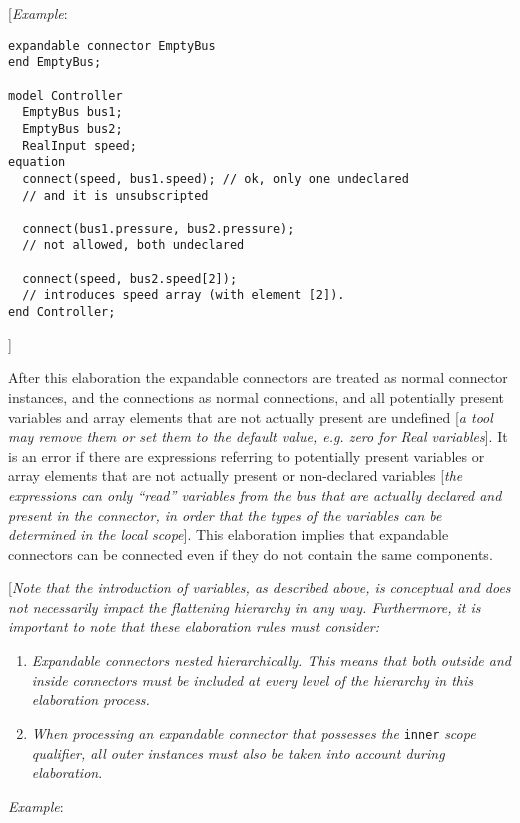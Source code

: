 {[}\emph{Example}:
\begin{lstlisting}[language=modelica]
expandable connector EmptyBus
end EmptyBus;

model Controller
  EmptyBus bus1;
  EmptyBus bus2;
  RealInput speed;
equation
  connect(speed, bus1.speed); // ok, only one undeclared
  // and it is unsubscripted

  connect(bus1.pressure, bus2.pressure);
  // not allowed, both undeclared

  connect(speed, bus2.speed[2]);
  // introduces speed array (with element [2]).
end Controller;
\end{lstlisting}
{]}

After this elaboration the expandable connectors are treated as normal
connector instances, and the connections as normal connections, and all
potentially present variables and array elements that are not actually
present are undefined {[}\emph{a tool may remove them or set them to the
default value, e.g. zero for Real variables}{]}. It is an error if there
are expressions referring to potentially present variables or array
elements that are not actually present or non-declared variables
{[}\emph{the expressions can only ``read'' variables from the bus that
are actually declared and present in the connector, in order that the
types of the variables can be determined in the local scope}{]}. This
elaboration implies that expandable connectors can be connected even if
they do not contain the same components.

{[}\emph{Note that the introduction of variables, as described above, is
conceptual and does not necessarily impact the flattening hierarchy in
any way. Furthermore, it is important to note that these elaboration
rules must consider:}

\begin{enumerate}
\item \emph{Expandable connectors nested hierarchically. This means that
both outside and inside connectors must be included at every level of
the hierarchy in this elaboration process.}
\item \emph{When processing an expandable connector that possesses the}
\lstinline!inner! \emph{scope qualifier, all outer instances must also be taken into
account during elaboration}.
\end{enumerate}
\emph{Example}:

